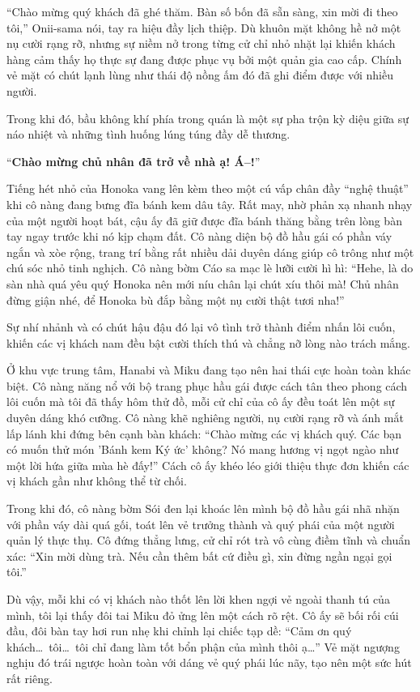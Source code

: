 \documentclass[../main.tex]{subfiles}
\begin{document}
``Chào mừng quý khách đã ghé thăm. Bàn số bốn đã sẵn sàng, xin mời đi theo tôi,'' Onii-sama nói, tay ra hiệu đầy lịch thiệp. Dù khuôn mặt không hề nở một nụ cười rạng rỡ, nhưng sự niềm nở trong từng cử chỉ nhỏ nhặt lại khiến khách hàng cảm thấy họ thực sự đang được phục vụ bởi một quản gia cao cấp. Chính vẻ mặt có chút lạnh lùng như thái độ nồng ấm đó đã ghi điểm được với nhiều người.

Trong khi đó, bầu không khí phía trong quán là một sự pha trộn kỳ diệu giữa sự náo nhiệt và những tình huống lúng túng đầy dễ thương.

``\textbf{Chào mừng chủ nhân đã trở về nhà ạ! Á--!}''

Tiếng hét nhỏ của Honoka vang lên kèm theo một cú vấp chân đầy ``nghệ thuật'' khi cô nàng đang bưng đĩa bánh kem dâu tây. Rất may, nhờ phản xạ nhanh nhạy của một người hoạt bát, cậu ấy đã giữ được đĩa bánh thăng bằng trên lòng bàn tay ngay trước khi nó kịp chạm đất. Cô nàng diện bộ đồ hầu gái có phần váy ngắn và xòe rộng, trang trí bằng rất nhiều dải duyên dáng giúp cô trông như một chú sóc nhỏ tinh nghịch. Cô nàng bờm Cáo sa mạc lè lưỡi cười hì hì: ``Hehe, là do sàn nhà quá yêu quý Honoka nên mới níu chân lại chút xíu thôi mà! Chủ nhân đừng giận nhé, để Honoka bù đắp bằng một nụ cười thật tươi nha!''

Sự nhí nhảnh và có chút hậu đậu đó lại vô tình trở thành điểm nhấn lôi cuốn, khiến các vị khách nam đều bật cười thích thú và chẳng nỡ lòng nào trách mắng.

Ở khu vực trung tâm, Hanabi và Miku đang tạo nên hai thái cực hoàn toàn khác biệt. Cô nàng năng nổ với bộ trang phục hầu gái được cách tân theo phong cách lôi cuốn mà tôi đã thấy hôm thử đồ, mỗi cử chỉ của cô ấy đều toát lên một sự duyên dáng khó cưỡng. Cô nàng khẽ nghiêng người, nụ cười rạng rỡ và ánh mắt lấp lánh khi đứng bên cạnh bàn khách: ``Chào mừng các vị khách quý. Các bạn có muốn thử món 'Bánh kem Ký ức' không? Nó mang hương vị ngọt ngào như một lời hứa giữa mùa hè đấy!'' Cách cô ấy khéo léo giới thiệu thực đơn khiến các vị khách gần như không thể từ chối.

Trong khi đó, cô nàng bờm Sói đen lại khoác lên mình bộ đồ hầu gái nhã nhặn với phần váy dài quá gối, toát lên vẻ trưởng thành và quý phái của một người quản lý thực thụ. Cô đứng thẳng lưng, cử chỉ rót trà vô cùng điềm tĩnh và chuẩn xác: ``Xin mời dùng trà. Nếu cần thêm bất cứ điều gì, xin đừng ngần ngại gọi tôi.''

Dù vậy, mỗi khi có vị khách nào thốt lên lời khen ngợi vẻ ngoài thanh tú của mình, tôi lại thấy đôi tai Miku đỏ ửng lên một cách rõ rệt. Cô ấy sẽ bối rối cúi đầu, đôi bàn tay hơi run nhẹ khi chỉnh lại chiếc tạp dề: ``Cảm ơn quý khách\dots\ tôi\dots\ tôi chỉ đang làm tốt bổn phận của mình thôi ạ\dots'' Vẻ mặt ngượng nghịu đó trái ngược hoàn toàn với dáng vẻ quý phái lúc nãy, tạo nên một sức hút rất riêng.
\end{document}
